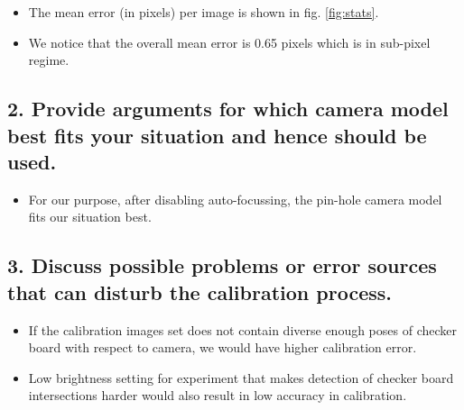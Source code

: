 \begin{itemize}
\item The mean error (in pixels) per image is shown in fig. \ref{fig:stats}.
\item We notice that the overall mean error is 0.65 pixels which is in sub-pixel regime.
\end{itemize}
\subsection*{2. Provide arguments for which camera model best fits your situation and hence should be used.}
\begin{itemize}
\item For our purpose, after disabling auto-focussing, the pin-hole camera model fits our situation best.
\end{itemize}

\subsection*{3. Discuss possible problems or error sources that can disturb the calibration process.}
\begin{itemize}
\item If the calibration images set does not contain diverse enough poses of checker board with respect to camera, we would have higher calibration error.
\item Low brightness setting for experiment that makes detection of checker board intersections harder would also result in low accuracy in calibration.
\end{itemize}
